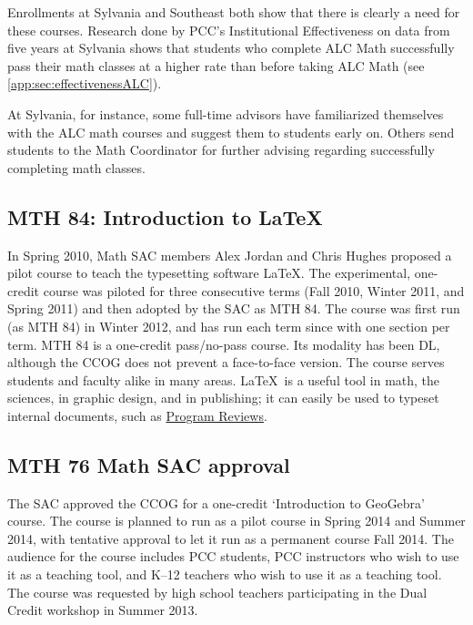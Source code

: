 Enrollments at Sylvania and Southeast both show that there is clearly a need for
these courses.  Research done by PCC's Institutional Effectiveness on data from
five years at Sylvania shows that students who complete ALC Math successfully
pass their math classes at a higher rate than before taking ALC Math  (see
\vref{app:sec:effectivenessALC}).


At Sylvania, for instance, some full-time advisors have familiarized themselves with the ALC math courses and
suggest them to students early on.  Others send students to the Math Coordinator for
further advising regarding successfully completing math classes.

\subsection{MTH 84: Introduction to \LaTeX}\label{other:sec:mth84}
In Spring 2010, Math SAC members Alex Jordan and Chris Hughes proposed a pilot
course to teach the typesetting software \LaTeX.  The experimental, one-credit course was piloted for
three consecutive terms (Fall 2010, Winter 2011, and Spring 2011) and then
adopted by the SAC as MTH 84.  The course was first run (as MTH 84) in Winter
2012, and has run each term since with one section per term. MTH 84 is a one-credit
pass/no-pass course. Its modality has been DL, although the CCOG does not
prevent a face-to-face version.  The course serves students and faculty alike in many areas.
\LaTeX\ is a useful tool in math, the sciences, in graphic design, and in
publishing; it can easily be used to typeset internal documents, such as \href{http://www.youtube.com/watch?v=XhduoHOYXUY}{\color{black}Program Reviews}.

\subsection{MTH 76 Math SAC approval}
The SAC approved the CCOG for a one-credit `Introduction to GeoGebra' course. The course is
planned to run as a pilot course in Spring 2014 and Summer 2014, with tentative
approval to let it run as a permanent course Fall 2014.  The audience for the
course includes PCC students, PCC instructors who wish to use it as a teaching
tool, and K--12 teachers who wish to use it as a teaching tool.  The course was
requested by high school teachers participating in the Dual Credit workshop in Summer 2013.

